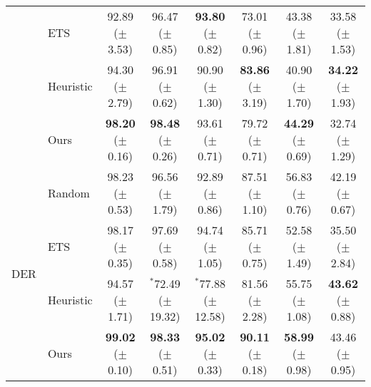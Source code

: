 \begin{table}[t]
{\begin{tabular}{l l c c c c c c}
     & ETS  & 92.89 {\scriptsize ($\pm$ 3.53)} & 96.47 {\scriptsize ($\pm$ 0.85)} & {\bf 93.80} {\scriptsize ($\pm$ 0.82)} & 73.01 {\scriptsize ($\pm$ 0.96)} & 43.38 {\scriptsize ($\pm$ 1.81)} & 33.58 {\scriptsize ($\pm$ 1.53)} \\
    & Heuristic & 94.30 {\scriptsize ($\pm$ 2.79)} & 96.91 {\scriptsize ($\pm$ 0.62)} & 90.90 {\scriptsize ($\pm$ 1.30)} & {\bf 83.86} {\scriptsize ($\pm$ 3.19)} & 40.90 {\scriptsize ($\pm$ 1.70)}  & {\bf 34.22} {\scriptsize ($\pm$ 1.93)} \\
    & Ours &  {\bf 98.20} {\scriptsize ($\pm$ 0.16)} & {\bf 98.48} {\scriptsize ($\pm$ 0.26)} &  93.61 {\scriptsize ($\pm$ 0.71)} & 79.72 {\scriptsize ($\pm$ 0.71)} & {\bf 44.29} {\scriptsize ($\pm$ 0.69)} & 32.74 {\scriptsize ($\pm$ 1.29)} \\  
    \midrule 
    \multirow{4}{*}{DER} & Random & 98.23 {\scriptsize ($\pm$ 0.53)} & 96.56 {\scriptsize ($\pm$ 1.79)}  & 92.89 {\scriptsize ($\pm$ 0.86)} & 87.51 {\scriptsize ($\pm$ 1.10)} & 56.83 {\scriptsize ($\pm$ 0.76)} & 42.19  {\scriptsize ($\pm$ 0.67)} \\ 
     & ETS  & 98.17 {\scriptsize ($\pm$ 0.35)} & 97.69 {\scriptsize ($\pm$ 0.58)} & 94.74 {\scriptsize ($\pm$ 1.05)} & 85.71 {\scriptsize ($\pm$ 0.75)} & 52.58 {\scriptsize ($\pm$ 1.49)} & 35.50  {\scriptsize ($\pm$ 2.84)} \\
    & Heuristic & 94.57 {\scriptsize ($\pm$ 1.71)} & $^{*}$72.49 {\scriptsize ($\pm$ 19.32)} & $^{*}$77.88 {\scriptsize ($\pm$ 12.58)} & 81.56 {\scriptsize ($\pm$ 2.28)} & 55.75 {\scriptsize ($\pm$ 1.08)} & {\bf 43.62} {\scriptsize ($\pm$ 0.88)} \\
     & Ours & {\bf 99.02} {\scriptsize ($\pm$ 0.10)} & {\bf 98.33} {\scriptsize ($\pm$ 0.51)} & {\bf 95.02} {\scriptsize ($\pm$ 0.33)} & {\bf 90.11} {\scriptsize ($\pm$ 0.18)} & {\bf 58.99} {\scriptsize ($\pm$ 0.98)} & 43.46  {\scriptsize ($\pm$ 0.95)}  \\  

\end{tabular}}
\end{table}
